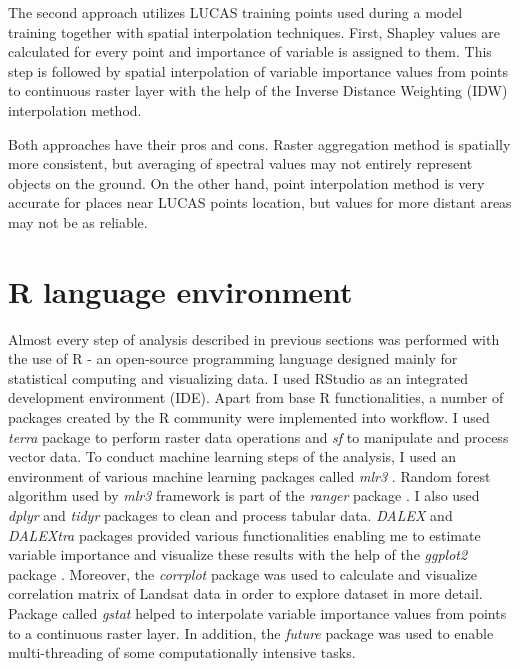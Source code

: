 \documentclass{amuthesis}
\begin{document}
The second approach utilizes LUCAS training points used during a model
training together with spatial interpolation techniques. First, Shapley
values are calculated for every point and importance of variable is
assigned to them. This step is followed by spatial interpolation of
variable importance values from points to continuous raster layer with
the help of the Inverse Distance Weighting (IDW) interpolation method.

Both approaches have their pros and cons. Raster aggregation method is
spatially more consistent, but averaging of spectral values may not
entirely represent objects on the ground. On the other hand, point
interpolation method is very accurate for places near LUCAS points
location, but values for more distant areas may not be as reliable.

\hypertarget{sec-r}{%
\section{R language environment}\label{sec-r}}

Almost every step of analysis described in previous sections was
performed with the use of R \autocite{R-base} - an open-source
programming language designed mainly for statistical computing and
visualizing data. I used RStudio \autocite{rstudio_team_rstudio_2020} as
an integrated development environment (IDE). Apart from base R
functionalities, a number of packages created by the R community were
implemented into workflow. I used \emph{terra} package
\autocite{R-terra} to perform raster data operations and \emph{sf}
\autocite{R-sf} to manipulate and process vector data. To conduct
machine learning steps of the analysis, I used an environment of various
machine learning packages called \emph{mlr3} \autocite{R-mlr3}. Random
forest algorithm used by \emph{mlr3} framework is part of the
\emph{ranger} package \autocite{R-ranger}. I also used \emph{dplyr}
\autocite{R-dplyr} and \emph{tidyr} packages \autocite{R-tidyr} to clean
and process tabular data. \emph{DALEX} \autocite{R-DALEX} and
\emph{DALEXtra} \autocite{R-DALEXtra} packages provided various
functionalities enabling me to estimate variable importance and
visualize these results with the help of the \emph{ggplot2} package
\autocite{R-ggplot2}. Moreover, the \emph{corrplot} package was used to
calculate and visualize correlation matrix of Landsat data in order to
explore dataset in more detail. Package called \emph{gstat}
\autocite{R-gstat} helped to interpolate variable importance values from
points to a continuous raster layer. In addition, the \emph{future}
package \autocite{R-future} was used to enable multi-threading of some
computationally intensive tasks.
\end{document}
